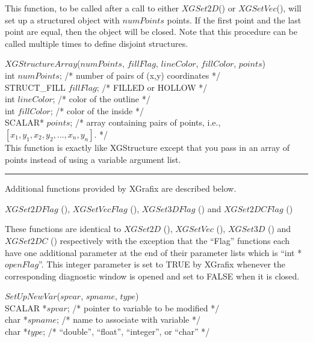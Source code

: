 This function, to be called after a call to either $XGSet2D$() or
$XGSetVec$(), will set up a structured object with $numPoints$  points.  If the
first point and the last point are equal, then the object will be
closed.  Note that this procedure can be called multiple times to
define disjoint structures.
\newpage
\begin{flushleft}
$XGStructureArray$($numPoints$, $fillFlag$, $lineColor$, $fillColor$, $points$) \\
int 		$numPoints$;	/* number of pairs of (x,y) coordinates */ \\
STRUCT\_FILL 	$fillFlag$;	/* FILLED or HOLLOW */ \\
int		$lineColor$;	/* color of the outline */ \\
int		$fillColor$;	/* color of the inside */ \\
SCALAR*		$points$;	/* array containing pairs of points, i.e., $[x_1,y_1,x_2,y_2,...,x_n,y_n]$. */\\

This function is exactly like XGStructure except that you pass in an array
of points instead of using a variable argument list.
\end{flushleft}


\def\xlen{4in}
\begin{minipage}{\xlen}
\begin{flushright}
\rule{\xlen}{.5pt}
\end{flushright}
\end{minipage}

\newpage
Additional functions provided by XGrafix are described below.

\begin{flushleft}
$XGSet2DFlag$ (), $XGSetVecFlag$ (), $XGSet3DFlag$ () and
$XGSet2DCFlag$ ()
\end{flushleft}

These functions are identical to $XGSet2D$ (), $XGSetVec$ (),
$XGSet3D$ () and $XGSet2DC$ () respectively with the exception that
the ``Flag'' functions each have one additional parameter at the end
of their parameter lists which is ``int *$openFlag$''.  This integer
parameter is set to TRUE by XGrafix whenever the corresponding
diagnostic window is opened and set to FALSE when it is closed.

\begin{flushleft}
$SetUpNewVar$($spvar$, $spname$, $type$) \\
SCALAR  *$spvar$;	/* pointer to variable to be modified  */ \\
char   *$spname$;	/* name to associate with variable     */ \\
char   *$type$;		/* ``double'', ``float'', ``integer'', or ``char'' */
\end{flushleft}

